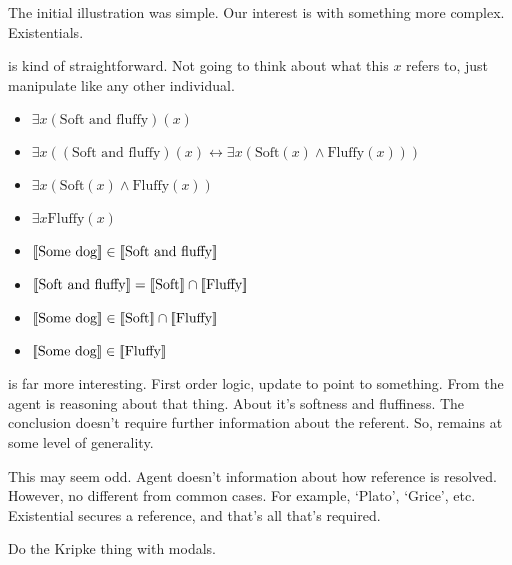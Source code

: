 \begin{note}
The initial illustration was simple.
Our interest is with something more complex.
Existentials.

\nr{} is kind of straightforward.
Not going to think about what this \(x\) refers to, just manipulate like any other individual.

\begin{itemize}
\item \(\exists x(\text{Soft and fluffy})(x)\)
\item \(\exists x((\text{Soft and fluffy})(x) \leftrightarrow \exists x(\text{Soft}(x) \land \text{Fluffy}(x)))\)
\item \(\exists x(\text{Soft}(x) \land \text{Fluffy}(x))\)
\item \(\exists x\text{Fluffy}(x)\)
\end{itemize}

\begin{itemize}
\item \([\![ \text{Some dog} ]\!] \in [\![ \text{Soft and fluffy} ]\!]\)
\item \([\![ \text{Soft and fluffy} ]\!] = [\![ \text{Soft} ]\!] \cap [\![ \text{Fluffy} ]\!]\)
\item \([\![ \text{Some dog} ]\!] \in [\![ \text{Soft} ]\!] \cap [\![ \text{Fluffy} ]\!]\)
\item \([\![ \text{Some dog} ]\!] \in [\![ \text{Fluffy} ]\!]\)
\end{itemize}

\ur{} is far more interesting.
First order logic, update to point to something.
From \ur{} the agent is reasoning about that thing.
About it's softness and fluffiness.
The conclusion doesn't require further information about the referent.
So, remains at some level of generality.

This may seem odd.
Agent doesn't information about how reference is resolved.
However, no different from common cases.
For example, `Plato', `Grice', etc.
Existential secures a reference, and that's all that's required.

Do the Kripke thing with modals.
\end{note}



